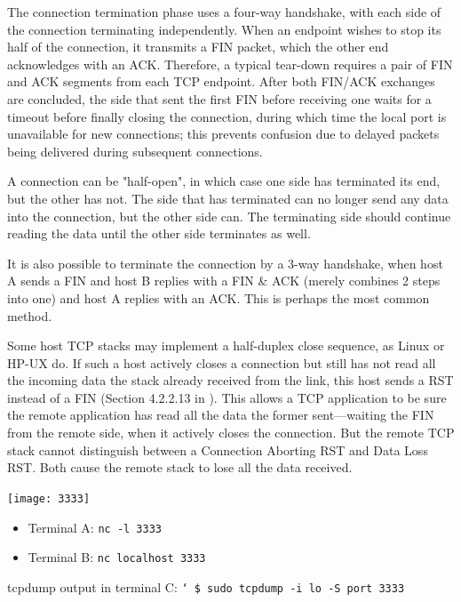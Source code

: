 The connection termination phase uses a four-way handshake, with each side of the
connection terminating independently. When an endpoint wishes to stop its half of the
connection, it transmits a FIN packet, which the other end acknowledges with an
ACK. Therefore, a typical tear-down requires a pair of FIN and ACK segments from each TCP
endpoint. After both FIN/ACK exchanges are concluded, the side that sent the first FIN
before receiving one waits for a timeout before finally closing the connection, during
which time the local port is unavailable for new connections; this prevents confusion due
to delayed packets being delivered during subsequent connections. 

A connection can be "half-open", in which case one side has terminated its end, but the
other has not. The side that has terminated can no longer send any data into the
connection, but the other side can. The terminating side should continue reading the data
until the other side terminates as well.

It is also possible to terminate the connection by a 3-way handshake, when host A sends a
FIN and host B replies with a FIN \& ACK (merely combines 2 steps into one) and host A
replies with an ACK. This is perhaps the most common method.

Some host TCP stacks may implement a half-duplex close sequence, as Linux or HP-UX do. If
such a host actively closes a connection but still has not read all the incoming data the
stack already received from the link, this host sends a RST instead of a FIN (Section
4.2.2.13 in ). This allows a TCP application to be sure the
remote application has read all the data the former sent—waiting the FIN from the remote
side, when it actively closes the connection. But the remote TCP stack cannot distinguish
between a Connection Aborting RST and Data Loss RST. Both cause the remote stack to lose
all the data received.


\begin{frame}%
  \begin{minipage}{.2\linewidth}
    \texttt{[image: 3333]}
  \end{minipage}
  \begin{minipage}{.78\linewidth}
    \begin{itemize}
    \item Terminal A: \texttt{nc -l 3333}
    \item Terminal B: \texttt{nc localhost 3333}
    \end{itemize}
  \end{minipage}
  \begin{iblock}{tcpdump output in terminal C:}
    \texttt{\char`~\$ sudo tcpdump -i lo -S port 3333}
    \begin{center}
    \end{center}
  \end{iblock}
\end{frame}

